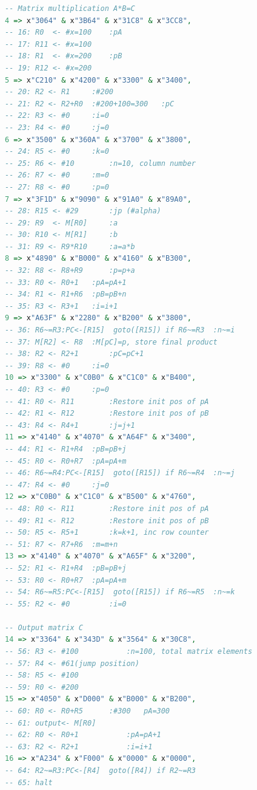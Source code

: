 \documentclass[]{article}
\begin{document}
\begin{lstlisting}[language=vhdl, caption={Matrix multiplication vhdl}, label={}]
-- Matrix multiplication A*B=C
4 => x"3064" & x"3B64" & x"31C8" & x"3CC8",
-- 16: R0  <- #x=100	:pA	
-- 17: R11 <- #x=100		
-- 18: R1  <- #x=200	:pB
-- 19: R12 <- #x=200
5 => x"C210" & x"4200" & x"3300" & x"3400",						
-- 20: R2 <- R1		:#200	  
-- 21: R2 <- R2+R0	:#200+100=300	:pC						
-- 22: R3 <- #0		:i=0
-- 23: R4 <- #0		:j=0						
6 => x"3500" & x"360A" & x"3700" & x"3800",
-- 24: R5 <- #0		:k=0
-- 25: R6 <- #10		:n=10, column number		
-- 26: R7 <- #0		:m=0
-- 27: R8 <- #0		:p=0						
7 => x"3F1D" & x"9090" & x"91A0" & x"89A0",
-- 28: R15 <- #29   	:jp (#alpha)						
-- 29: R9  <- M[R0] 	:a												
-- 30: R10 <- M[R1] 	:b												
-- 31: R9 <- R9*R10 	:a=a*b										
8 => x"4890" & x"B000" & x"4160" & x"B300",
-- 32: R8 <- R8+R9  	:p=p+a										
-- 33: R0 <- R0+1  	:pA=pA+1									
-- 34: R1 <- R1+R6 	:pB=pB+n											
-- 35: R3 <- R3+1  	:i=i+1											
9 => x"A63F" & x"2280" & x"B200" & x"3800",
-- 36: R6~=R3:PC<-[R15]  goto([R15]) if R6~=R3	:n~=i									
-- 37: M[R2] <- R8	:M[pC]=p, store final product						
-- 38: R2 <- R2+1		:pC=pC+1											
-- 39: R8 <- #0		:i=0												
10 => x"3300" & x"C0B0" & x"C1C0" & x"B400",
-- 40: R3 <- #0		:p=0											
-- 41: R0 <- R11		:Restore init pos of pA					
-- 42: R1 <- R12		:Restore init pos of pB						
-- 43: R4 <- R4+1		:j=j+1											
11 => x"4140" & x"4070" & x"A64F" & x"3400",
-- 44: R1 <- R1+R4	:pB=pB+j												
-- 45: R0 <- R0+R7	:pA=pA+m												
-- 46: R6~=R4:PC<-[R15]  goto([R15]) if R6~=R4	:n~=j						
-- 47: R4 <- #0		:j=0
12 => x"C0B0" & x"C1C0" & x"B500" & x"4760",
-- 48: R0 <- R11		:Restore init pos of pA						
-- 49: R1 <- R12		:Restore init pos of pB
-- 50: R5 <- R5+1		:k=k+1, inc row counter
-- 51: R7 <- R7+R6	:m=m+n
13 => x"4140" & x"4070" & x"A65F" & x"3200",
-- 52: R1 <- R1+R4	:pB=pB+j						
-- 53: R0 <- R0+R7	:pA=pA+m						
-- 54: R6~=R5:PC<-[R15]  goto([R15]) if R6~=R5	:n~=k						
-- 55: R2 <- #0			:i=0

-- Output matrix C
14 => x"3364" & x"343D" & x"3564" & x"30C8",												
-- 56: R3 <- #100			:n=100, total matrix elements
-- 57: R4 <- #61(jump position)
-- 58: R5 <- #100	
-- 59: R0 <- #200 				
15 => x"4050" & x"D000" & x"B000" & x"B200",						
-- 60: R0 <- R0+R5		:#300	pA=300
-- 61: output<- M[R0]
-- 62: R0 <- R0+1			:pA=pA+1
-- 63: R2 <- R2+1			:i=i+1
16 => x"A234" & x"F000" & x"0000" & x"0000",						
-- 64: R2~=R3:PC<-[R4]  goto([R4]) if R2~=R3
-- 65: halt		
\end{lstlisting}
\end{document}
